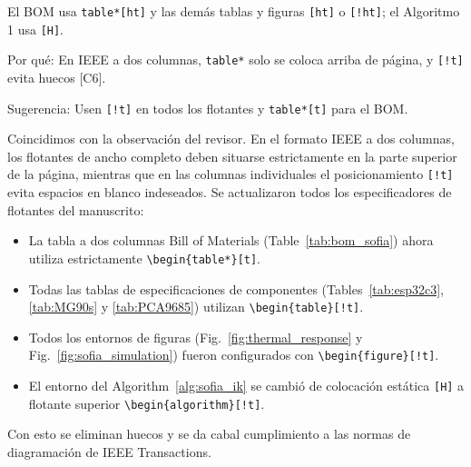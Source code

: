 \documentclass{LabDSTresponse}
\begin{document}
{El BOM usa \texttt{table*[ht]} y las demás tablas y figuras \texttt{[ht]} o \texttt{[!ht]}; el Algoritmo 1 usa \texttt{[H]}.

Por qué: En IEEE a dos columnas, \texttt{table*} solo se coloca arriba de página, y \texttt{[!t]} evita huecos [C6].

Sugerencia: Usen \texttt{[!t]} en todos los flotantes y \texttt{table*[t]} para el BOM.}
{Coincidimos con la observación del revisor. En el formato IEEE a dos columnas, los flotantes de ancho completo deben situarse estrictamente en la parte superior de la página, mientras que en las columnas individuales el posicionamiento \texttt{[!t]} evita espacios en blanco indeseados. Se actualizaron todos los especificadores de flotantes del manuscrito:
\begin{itemize}
    \item La tabla a dos columnas Bill of Materials (Table~\ref{tab:bom_sofia}) ahora utiliza estrictamente \texttt{\textbackslash begin\{table*\}[t]}.
    \item Todas las tablas de especificaciones de componentes (Tables~\ref{tab:esp32c3}, \ref{tab:MG90s} y \ref{tab:PCA9685}) utilizan \texttt{\textbackslash begin\{table\}[!t]}.
    \item Todos los entornos de figuras (Fig.~\ref{fig:thermal_response} y Fig.~\ref{fig:sofia_simulation}) fueron configurados con \texttt{\textbackslash begin\{figure\}[!t]}.
    \item El entorno del Algorithm~\ref{alg:sofia_ik} se cambió de colocación estática \texttt{[H]} a flotante superior \texttt{\textbackslash begin\{algorithm\}[!t]}.
\end{itemize}
Con esto se eliminan huecos y se da cabal cumplimiento a las normas de diagramación de IEEE Transactions.}
\end{document}
